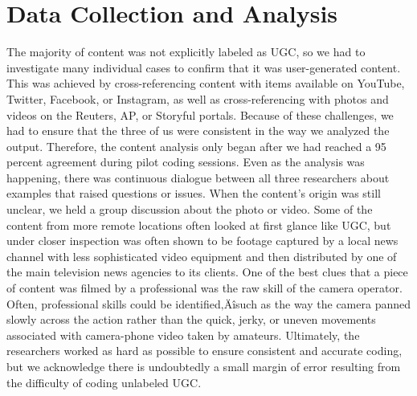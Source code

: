 \documentclass[symmetric, notoc, nobib]{towcenter-book}
\begin{document}
\section{Data Collection and Analysis}
The majority of content was not explicitly labeled as UGC, so we had to
investigate many individual cases to confirm that it was user-generated content. This was achieved by cross-referencing content with items available on YouTube, Twitter, Facebook, or Instagram, as well as cross-referencing with photos and videos on the Reuters, AP, or Storyful portals. Because of these challenges, we had to ensure that the three of us were consistent in the way we analyzed the output. Therefore, the content analysis only began after we had reached a 95 percent agreement during pilot coding sessions. Even as the analysis was happening, there was continuous dialogue between all
three researchers about examples that raised questions or issues.
When the content's origin was still unclear, we held a group discussion
about the photo or video. Some of the content from more remote locations
often looked at first glance like UGC, but under closer inspection was often
shown to be footage captured by a local news channel with less sophisticated
video equipment and then distributed by one of the main television
news agencies to its clients. One of the best clues that a piece of content
was filmed by a professional was the raw skill of the camera operator. Often,
professional skills could be identified‚Äîsuch as the way the camera panned
slowly across the action rather than the quick, jerky, or uneven movements
associated with camera-phone video taken by amateurs. Ultimately, the
researchers worked as hard as possible to ensure consistent and accurate
coding, but we acknowledge there is undoubtedly a small margin of error
resulting from the difficulty of coding unlabeled UGC.
\end{document}
